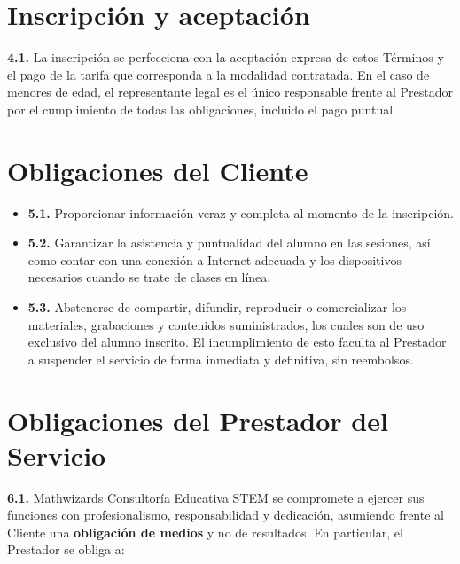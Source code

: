 \documentclass[12pt, letterpaper]{article}
\begin{document}
\section{Inscripción y aceptación}

\noindent\textbf{4.1.} La inscripción se perfecciona con la aceptación expresa de estos Términos y el pago de la tarifa que corresponda a la modalidad contratada. En el caso de menores de edad, el representante legal es el único responsable frente al Prestador por el cumplimiento de todas las obligaciones, incluido el pago puntual.

\section{Obligaciones del Cliente}

\begin{itemize}[leftmargin=1.5em, itemsep=4pt, topsep=4pt]
  \item \textbf{5.1.} Proporcionar información veraz y completa al momento de la inscripción.
  \item \textbf{5.2.} Garantizar la asistencia y puntualidad del alumno en las sesiones, así como contar con una conexión a Internet adecuada y los dispositivos necesarios cuando se trate de clases en línea.
  \item \textbf{5.3.} Abstenerse de compartir, difundir, reproducir o comercializar los materiales, grabaciones y contenidos suministrados, los cuales son de uso exclusivo del alumno inscrito. El incumplimiento de esto faculta al Prestador a suspender el servicio de forma inmediata y definitiva, sin reembolsos.
\end{itemize}

\section{Obligaciones del Prestador del Servicio}

\noindent\textbf{6.1.} Mathwizards Consultoría Educativa STEM se compromete a ejercer sus funciones con profesionalismo, responsabilidad y dedicación, asumiendo frente al Cliente una \textbf{obligación de medios} y no de resultados. En particular, el Prestador se obliga a:
\end{document}
